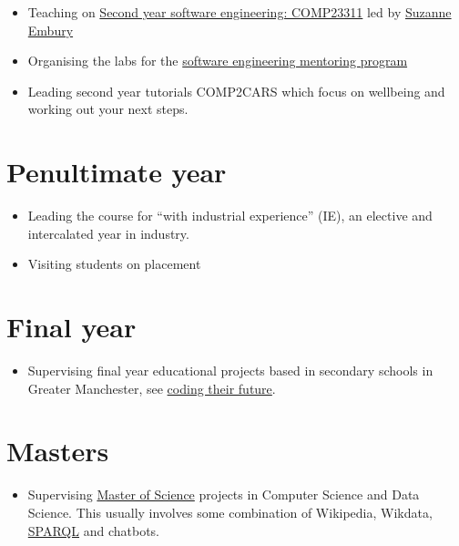 \documentclass[12pt,]{book}
\providecommand{\tightlist}{%
  \setlength{\itemsep}{0pt}\setlength{\parskip}{0pt}}
\begin{document}
\begin{itemize}
\tightlist
\item
  Teaching on \href{https://studentnet.cs.manchester.ac.uk/ugt/COMP23311/syllabus/}{Second year software engineering: COMP23311} led by \href{http://www.cs.man.ac.uk/~embury/}{Suzanne Embury}
\item
  Organising the labs for the \href{https://www.cs.manchester.ac.uk/connect/business-engagement/industrial-mentoring/}{software engineering mentoring program}
\item
  Leading second year tutorials COMP2CARS which focus on wellbeing and working out your next steps.
\end{itemize}

\hypertarget{penultimate-year}{%
\section{Penultimate year}\label{penultimate-year}}

\begin{itemize}
\tightlist
\item
  Leading the course for ``with industrial experience'' (IE), an elective and intercalated year in industry.
\item
  Visiting students on placement
\end{itemize}

\hypertarget{final-year}{%
\section{Final year}\label{final-year}}

\begin{itemize}
\tightlist
\item
  Supervising final year educational projects based in secondary schools in Greater Manchester, see \protect\hyperlink{coding-their-future}{coding their future}. \citep{computinged}
\end{itemize}

\hypertarget{masters}{%
\section{Masters}\label{masters}}

\begin{itemize}
\tightlist
\item
  Supervising \href{https://www.cs.manchester.ac.uk/study/masters/}{Master of Science} projects in Computer Science and Data Science. \citep{r4ds} This usually involves some combination of Wikipedia, Wikdata, \href{https://en.wikipedia.org/wiki/SPARQL}{SPARQL} \citep{ducharme} and chatbots. 🤖 \citep{myca}
\end{itemize}
\end{document}
